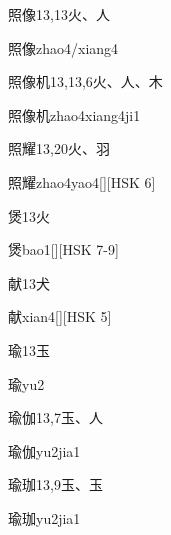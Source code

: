 \begin{Entry}{照像}{13,13}{⽕、⼈}
  \begin{Phonetics}{照像}{zhao4/xiang4}
  \end{Phonetics}
\end{Entry}

\begin{Entry}{照像机}{13,13,6}{⽕、⼈、⽊}
  \begin{Phonetics}{照像机}{zhao4xiang4ji1}
  \end{Phonetics}
\end{Entry}

\begin{Entry}{照耀}{13,20}{⽕、⽻}
  \begin{Phonetics}{照耀}{zhao4yao4}[][HSK 6]
  \end{Phonetics}
\end{Entry}

\begin{Entry}{煲}{13}{⽕}
  \begin{Phonetics}{煲}{bao1}[][HSK 7-9]
  \end{Phonetics}
\end{Entry}

\begin{Entry}{献}{13}{⽝}
  \begin{Phonetics}{献}{xian4}[][HSK 5]
  \end{Phonetics}
\end{Entry}

\begin{Entry}{瑜}{13}{⽟}
  \begin{Phonetics}{瑜}{yu2}
  \end{Phonetics}
\end{Entry}

\begin{Entry}{瑜伽}{13,7}{⽟、⼈}
  \begin{Phonetics}{瑜伽}{yu2jia1}
  \end{Phonetics}
\end{Entry}

\begin{Entry}{瑜珈}{13,9}{⽟、⽟}
  \begin{Phonetics}{瑜珈}{yu2jia1}
  \end{Phonetics}
\end{Entry}

